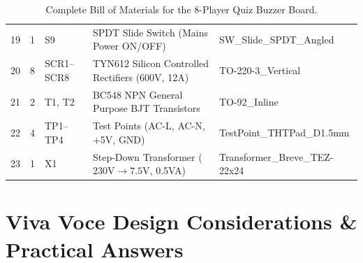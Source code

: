 \documentclass[11pt,a4paper]{article}
\begin{document}
\begin{table}[H]
\begin{tabularx}{\textwidth}{l l l X l}
19 & 1 & S9 & SPDT Slide Switch (Mains Power ON/OFF) & SW\_Slide\_SPDT\_Angled \\
20 & 8 & SCR1--SCR8 & TYN612 Silicon Controlled Rectifiers (600V, 12A) & TO-220-3\_Vertical \\
21 & 2 & T1, T2 & BC548 NPN General Purpose BJT Transistors & TO-92\_Inline \\
22 & 4 & TP1--TP4 & Test Points (AC-L, AC-N, +5V, GND) & TestPoint\_THTPad\_D1.5mm \\
23 & 1 & X1 & Step-Down Transformer ($230\text{V} \to 7.5\text{V}$, 0.5VA) & Transformer\_Breve\_TEZ-22x24 \\
\bottomrule
\end{tabularx}
\caption{Complete Bill of Materials for the 8-Player Quiz Buzzer Board.}
\end{table}

\clearpage

\section{Viva Voce Design Considerations \& Practical Answers}
\end{document}
